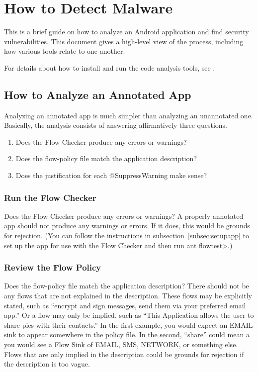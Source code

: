 \htmlhr
\chapter{How to Detect Malware\label{appanalysis}}

This is a brief guide on how to analyze an Android application and
find security vulnerabilities. This document gives a high-level view
of the process, including how various tools relate to one another.

For details about how to install and run the code analysis tools, see .

\section{How to Analyze an Annotated App}
Analyzing an annotated app is much simpler than analyzing an unannotated one.  Basically, the analysis consists of answering affirmatively three questions.

\begin{enumerate}
\item Does the Flow Checker produce any errors or warnings?
\item Does the flow-policy file match the application description?
\item Does the justification for each @SuppressWarning make sense?
\end{enumerate}

\subsection{Run the Flow Checker}
Does the Flow Checker produce any errors or warnings? A properly annotated app should not produce
any warnings or errors.  If it does, this would be grounds for rejection.  (You can follow the instructions 
in subsection~\ref{subsec:setupapp} to set up the app for use with the Flow Checker and then run
\<ant flowtest>.)

\subsection{Review the Flow Policy}
Does the flow-policy file match the application description? There should not be any flows that are not 
explained in the description.  These flows may be explicitly stated, such as ``encrypt and sign messages, send them via your preferred email app.''   Or a flow may only be implied, such as ``This Application allows the user to share pics with their contacts.''  In the first example, you would expect an EMAIL sink to appear somewhere in the policy file. In the second, ``share'' could mean a you would see a Flow Sink of EMAIL, SMS, NETWORK, or something else.  Flows that are only implied in the description could be grounds for rejection if the description is too vague. 

